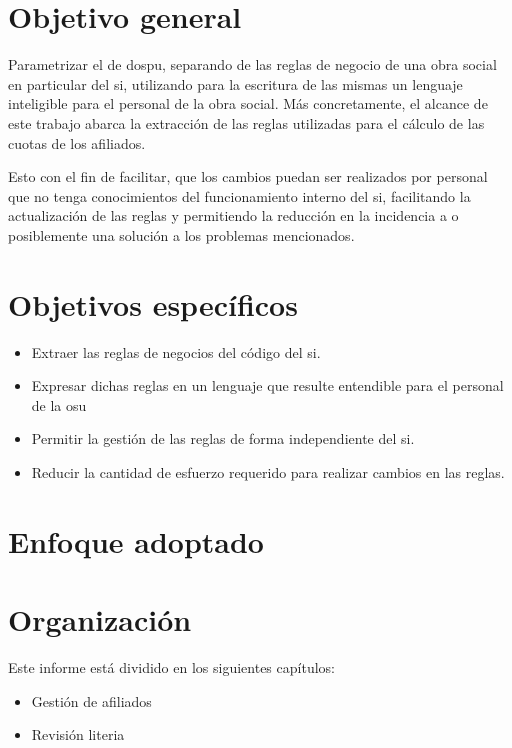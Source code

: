 \section{Objetivo general}
Parametrizar el \SIOSU de \acrfull{dospu}, separando de las reglas de negocio de una obra social en particular del \acrshort{si}, utilizando para la escritura de las mismas un lenguaje inteligible para el personal de la obra social. Más concretamente, el alcance de este trabajo abarca la extracción de las reglas utilizadas para el cálculo de las cuotas de los afiliados.

Esto con el fin de facilitar, que los cambios puedan ser realizados por personal que no tenga conocimientos del funcionamiento interno del \acrshort{si}, facilitando la actualización de las reglas y permitiendo la reducción en la incidencia a o posiblemente una solución a los problemas mencionados.

\section{Objetivos específicos}
\begin{itemize}
	\item Extraer las reglas de negocios del código del \acrlong{si}.
	\item Expresar dichas reglas en un lenguaje que resulte entendible para el personal de la \acrlong{osu}
	\item Permitir la gestión de las reglas de forma independiente del \acrshort{si}.
	\item Reducir la cantidad de esfuerzo requerido para realizar cambios en las reglas.
\end{itemize}

\section{Enfoque adoptado}


\section{Organización}


Este informe está dividido en los siguientes capítulos:
\begin{itemize}
	\item Gestión de afiliados
	\item Revisión literia
\end{itemize}
